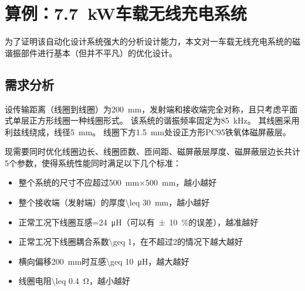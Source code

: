 \documentclass[index]{subfiles}
\begin{document}
\chapter{算例：\SI{7.7}{\kilo\watt}车载无线充电系统}\label{sec:example}
为了证明该自动化设计系统强大的分析设计能力，本文对一车载无线充电系统的磁谐振部件进行基本（但并不平凡）的优化设计。

\section{需求分析}\label{sec:example-req}
设传输距离（线圈到线圈）为\SI{200}{\milli\metre}，发射端和接收端完全对称，且只考虑平面式单层正方形线圈一种线圈形式。
该系统的谐振频率固定为\SI{85}{\kilo\hertz}。
其线圈采用利兹线绕成，线径\SI{5}{\milli\metre}。
线圈下方\SI{1.5}{\milli\metre}处设正方形PC95铁氧体磁屏蔽层。

现需要同时优化线圈边长、线圈匝数、匝间距、磁屏蔽层厚度、磁屏蔽层边长共计5个参数，使得系统性能同时满足以下几个标准：
\begin{itemize}
  \item 整个系统的尺寸不应超过\SI{500}{\milli\metre}$\times$\SI{500}{\milli\metre}，越小越好
  \item 整个接收端（发射端）的厚度\SI{\leq 30}{\milli\metre}，越小越好
  \item 正常工况下线圈互感\SI{=24}{\micro\henry}（可以有\SI{\pm 10}{\percent}的误差），越准越好
  \item 正常工况下线圈耦合系数\num{\geq 1}，在不超过2的情况下越大越好
  \item 横向偏移\SI{200}{\milli\metre}时互感\SI{\geq 10}{\micro\henry}，越大越好
  \item 线圈电阻\SI{\leq 0.4}{\ohm}，越小越好
\end{itemize}
\end{document}
